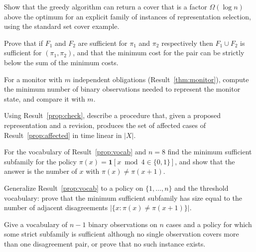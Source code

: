 \begin{exercise}
Show that the greedy algorithm can return a cover that is a factor $\Omega(\log n)$ above the optimum for an explicit family of instances of representation selection, using the standard set cover example.
\end{exercise}

\begin{exercise}
Prove that if $F_1$ and $F_2$ are sufficient for $\pi_1$ and $\pi_2$ respectively then $F_1\cup F_2$ is sufficient for $(\pi_1,\pi_2)$, and that the minimum cost for the pair can be strictly below the sum of the minimum costs.
\end{exercise}

\begin{exercise}
For a monitor with $m$ independent obligations (Result~\ref{thm:monitor}), compute the minimum number of binary observations needed to represent the monitor state, and compare it with $m$.
\end{exercise}

\begin{exercise}
Using Result~\ref{prop:check}, describe a procedure that, given a proposed representation and a revision, produces the set of affected cases of Result~\ref{prop:affected} in time linear in $|X|$.
\end{exercise}


\begin{exercise}
For the vocabulary of Result~\ref{prop:vocab} and $n=8$ find the minimum sufficient subfamily for the policy $\pi(x)=\mathbf 1[x\bmod 4\in\{0,1\}]$, and show that the answer is the number of $x$ with $\pi(x)\ne\pi(x+1)$.\label{ex:mod4-policy}
\end{exercise}

\begin{exercise}
Generalize Result~\ref{prop:vocab} to a policy on $\{1,\dots,n\}$ and the threshold vocabulary: prove that the minimum sufficient subfamily has size equal to the number of adjacent disagreements $|\{x:\pi(x)\ne\pi(x+1)\}|$.
\end{exercise}

\begin{exercise}
Give a vocabulary of $n-1$ binary observations on $n$ cases and a policy for which some strict subfamily is sufficient although no single observation covers more than one disagreement pair, or prove that no such instance exists.
\end{exercise}

